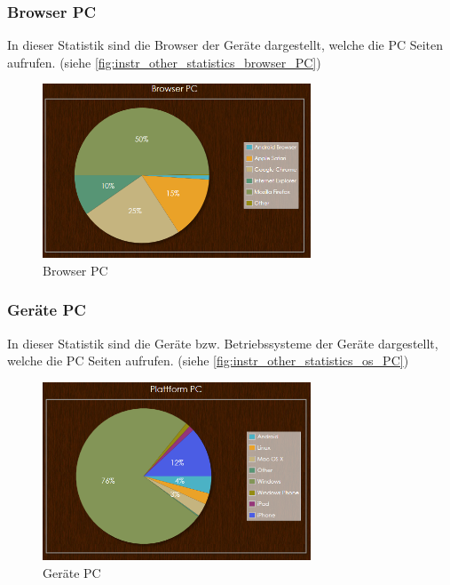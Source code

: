 \subsubsection{Browser PC}
In dieser Statistik sind die Browser der Geräte dargestellt, welche die PC Seiten aufrufen. (siehe \autoref{fig:instr_other_statistics_browser_PC})
\begin{figure}[H]
\centering
\includegraphics[keepaspectratio=true, width=8cm]{images/screenshots/statistics_browser_PC.png}
\caption{Browser PC}
\label{fig:instr_other_statistics_browser_PC}
\end{figure}
\subsubsection{Geräte PC}
In dieser Statistik sind die Geräte bzw. Betriebssysteme der Geräte dargestellt, welche die PC Seiten aufrufen. (siehe \autoref{fig:instr_other_statistics_os_PC})
\begin{figure}[H]
\centering
\includegraphics[keepaspectratio=true, width=8cm]{images/screenshots/statistics_os_PC.png}
\caption{Geräte PC}
\label{fig:instr_other_statistics_os_PC}
\end{figure}

